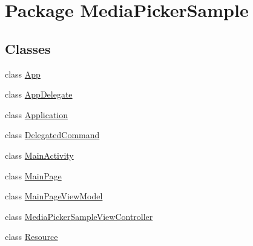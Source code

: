 \hypertarget{namespace_media_picker_sample}{\section{Package Media\+Picker\+Sample}
\label{namespace_media_picker_sample}
}
\subsection*{Classes}
\begin{DoxyCompactItemize}
\item 
class \hyperlink{class_media_picker_sample_1_1_app}{App}
\item 
class \hyperlink{class_media_picker_sample_1_1_app_delegate}{App\+Delegate}
\item 
class \hyperlink{class_media_picker_sample_1_1_application}{Application}
\item 
class \hyperlink{class_media_picker_sample_1_1_delegated_command}{Delegated\+Command}
\item 
class \hyperlink{class_media_picker_sample_1_1_main_activity}{Main\+Activity}
\item 
class \hyperlink{class_media_picker_sample_1_1_main_page}{Main\+Page}
\item 
class \hyperlink{class_media_picker_sample_1_1_main_page_view_model}{Main\+Page\+View\+Model}
\item 
class \hyperlink{class_media_picker_sample_1_1_media_picker_sample_view_controller}{Media\+Picker\+Sample\+View\+Controller}
\item 
class \hyperlink{class_media_picker_sample_1_1_resource}{Resource}
\end{DoxyCompactItemize}
